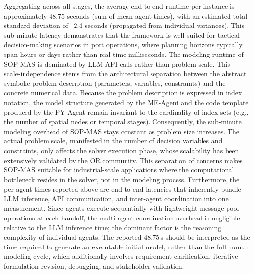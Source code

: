 \documentclass[preprint,12pt]{elsarticle}
\begin{document}
Aggregating across all stages, the average end-to-end runtime per instance is approximately 48.75 seconds (sum of mean agent times), with an estimated total standard deviation of ~2.4 seconds (propagated from individual variances). This sub-minute latency demonstrates that the framework is well-suited for tactical decision-making scenarios in port operations, where planning horizons typically span hours or days rather than real-time milliseconds. The modeling runtime of SOP-MAS is dominated by LLM API calls rather than problem scale. This scale‑independence stems from the architectural separation between the abstract symbolic problem description (parameters, variables, constraints) and the concrete numerical data. Because the problem description is expressed in index notation, the model structure generated by the ME‑Agent and the code template produced by the PY‑Agent remain invariant to the cardinality of index sets (e.g., the number of spatial nodes or temporal stages). Consequently, the sub‑minute modeling overhead of SOP‑MAS stays constant as problem size increases. The actual problem scale, manifested in the number of decision variables and constraints, only affects the solver execution phase, whose scalability has been extensively validated by the OR community. This separation of concerns makes SOP‑MAS suitable for industrial‑scale applications where the computational bottleneck resides in the solver, not in the modeling process. Furthermore, the per-agent times reported above are end-to-end latencies that inherently bundle LLM inference, API communication, and inter-agent coordination into one measurement. Since agents execute sequentially with lightweight message-pool operations at each handoff, the multi-agent coordination overhead is negligible relative to the LLM inference time; the dominant factor is the reasoning complexity of individual agents. The reported 48.75\,s should be interpreted as the time required to generate an executable initial model, rather than the full human modeling cycle, which additionally involves requirement clarification, iterative formulation revision, debugging, and stakeholder validation.

\end{document}
